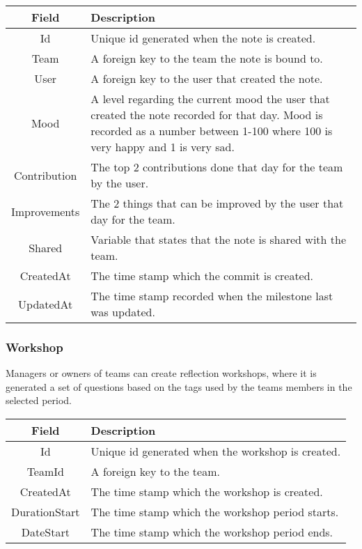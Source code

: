 \vspace{0.5cm}
\begin{tabularx}{\linewidth}{| c | X |}
    \hline
    \rowcolor[gray]{0.8}
    \textbf{Field} & \textbf{Description} \\
    \hline
    Id & Unique id generated when the note is created.\\ \hline
    Team & A foreign key to the team the note is bound to.\\ \hline
   	User & A foreign key to the user that created the note.\\ \hline
   	Mood & A level regarding the current mood the user that created the note recorded for that day. Mood is recorded as a number between 1-100 where 100 is very happy and 1 is very sad.\\ \hline
   	Contribution & The top 2 contributions done that day for the team by the user.\\ \hline
   	Improvements & The 2 things that can be improved by the user that day for the team.\\ \hline
   	Shared & Variable that states that the note is shared with the team.\\ \hline
    CreatedAt & The time stamp which the commit is created.\\ \hline
    UpdatedAt & The time stamp recorded when the milestone last was updated.\\ 
    \hline
\end{tabularx}
\vspace{0.5cm}

\subsubsection*{Workshop}
Managers or owners of teams can create reflection workshops, where it is generated a set of questions based on the tags used by the teams members in the selected period. \\

\vspace{0.5cm}
\begin{tabularx}{\linewidth}{| c | X |}
    \hline
    \rowcolor[gray]{0.8}
    \textbf{Field} & \textbf{Description} \\
    \hline
    Id & Unique id generated when the workshop is created.\\ \hline
   	TeamId & A foreign key to the team.\\ \hline
   	CreatedAt & The time stamp which the workshop is created.\\ \hline
   	DurationStart & The time stamp which the workshop period starts.\\ \hline
   	DateStart & The time stamp which the workshop period ends.\\ 
    \hline
\end{tabularx}
\vspace{0.5cm}

